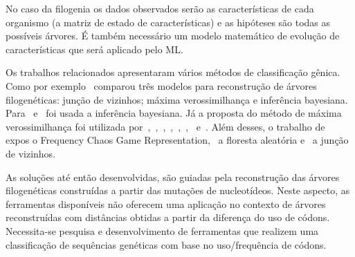 \documentclass[font=plain]{abnt}
\begin{document}
No caso da filogenia os dados observados serão as características de cada organismo (a matriz de estado de características) e as hipóteses são todas as possíveis árvores. É também necessário um modelo matemático de evolução de características que será aplicado pelo ML.

Os trabalhos relacionados apresentaram vários métodos de classificação gênica. Como por exemplo~\cite{dimitrov_updated_2019} comparou três modelos para reconstrução de árvores filogenéticas: junção de vizinhos; máxima verossimilhança e inferência bayesiana. Para~\cite{yin_systematic_2019} e~\cite{bedoya-pilozo_molecular_epidemiology_2018} foi usada a inferência bayesiana. Já a proposta do método de máxima verossimilhança foi utilizada por~\cite{fall_genetic_diversity_2021},~\cite{behl_threat_2022},~\cite{shabbir_comprehensive_2020},~\cite{hudu_hepatitis_2018},~\cite{sallard_tracing_2021},~\cite{paez-espino_diversity_evolution_2019},~\cite{tang_evolutionary_2021} e~\cite{cho_analysis_2022}. Além desses, o trabalho de~\cite{lichtblau_alignment-free_2019} expos o Frequency Chaos Game Representation,~\cite{kim_ngs_2022} a floresta aleatória e~\cite{potdar_phylogenetic_2021} a junção de vizinhos.

As soluções até então desenvolvidas, são guiadas pela reconstrução das árvores filogenéticas construídas a partir das mutações de nucleotídeos. Neste aspecto, as ferramentas disponíveis não oferecem uma aplicação no contexto de árvores reconstruídas com distâncias obtidas a partir da diferença do uso de códons. Necessita-se pesquisa e desenvolvimento de ferramentas que realizem uma classificação de sequências genéticas com base no uso/frequência de códons.


\end{document}
